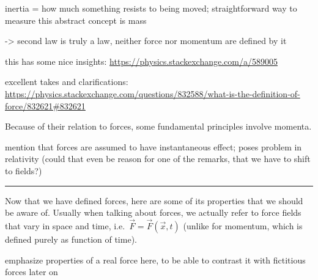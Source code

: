 \documentclass[../class_mech_main.tex]{subfiles}
\begin{document}
inertia = how much something resists to being moved; straightforward way to measure this abstract concept is mass


-> second law is truly a law, neither force nor momentum are defined by it


this has some nice insights: \url{https://physics.stackexchange.com/a/589005}


excellent takes and clarifications: \url{https://physics.stackexchange.com/questions/832588/what-is-the-definition-of-force/832621#832621}



Because of their relation to forces, some fundamental principles involve momenta. 



mention that forces are assumed to have instantaneous effect; poses problem in relativity (could that even be reason for one of the remarks, that we have to shift to fields?)


\hrule


Now that we have defined forces, here are some of its properties that we should be aware of. Usually when talking about forces, we actually refer to force fields that vary in space and time, i.e.~$\vec{F} = \vec{F}(\vec{x}, t)$ (unlike for momentum, which is defined purely as function of time).


emphasize properties of a real force here, to be able to contrast it with fictitious forces later on


\end{document}
